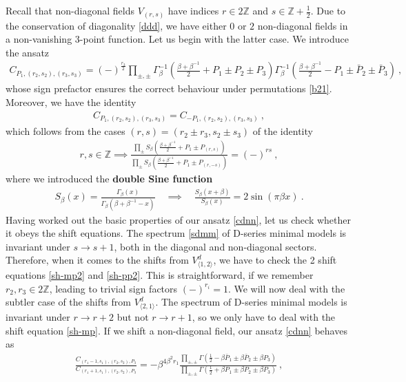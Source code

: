 \documentclass[12pt, a4paper]{article}
\newcommand{\myindex}[1]{\textbf{\boldmath #1}}
\begin{document}
Recall that non-diagonal fields $V_{(r,s)}$ have indices $r\in 2\mathbb{Z}$ and $s\in\mathbb{Z}+\frac12$. 
Due to the conservation of diagonality \eqref{ddd}, we have either $0$ or $2$ non-diagonal fields in a non-vanishing 3-point function. Let us begin with the latter case. We introduce the ansatz 
\begin{align}
 \boxed{C_{P_1,(r_2,s_2),(r_3,s_3)} = (-)^{\frac{r_3}{2}}\prod_{\pm,\pm}
 \Gamma_\beta^{-1}\left(\tfrac{\beta+\beta^{-1}}{2}+P_1 \pm P_2\pm P_3\right) 
 \Gamma_\beta^{-1}\left(\tfrac{\beta+\beta^{-1}}{2}-P_1 \pm \bar P_2\pm \bar P_3\right)}\ ,
 \label{cdnn}
\end{align}
whose sign prefactor ensures the correct behaviour under permutations \eqref{b21}. Moreover, we have the identity
\begin{align}
 C_{P_1,(r_2,s_2),(r_3,s_3)}=C_{-P_1,(r_2,s_2),(r_3,s_3)} \ ,
 \label{cpcmp}
\end{align}
which follows from the cases $(r,s)=(r_2\pm r_3,s_2\pm s_3)$ of the identity 
\begin{align}
 r,s\in\mathbb{Z} \implies \frac{\prod_\pm S_\beta\left(\frac{\beta+\beta^{-1}}{2} +P_1 \pm P_{(r,s)}\right)}{\prod_\pm S_\beta\left(\frac{\beta+\beta^{-1}}{2} +P_1 \pm P_{(r,-s)}\right)} =(-)^{rs}\ ,
 \label{dsr}
\end{align}
where we introduced the \myindex{double Sine function}
\begin{align}
 S_\beta(x) = \frac{\Gamma_\beta(x)}{\Gamma_\beta(\beta + \beta^{-1}-x)}\quad \implies \quad \frac{S_\beta(x+\beta)}{S_\beta(x)} = 2\sin(\pi\beta x)\ .
 \label{sb}
\end{align}
Having worked out the basic properties of our ansatz \eqref{cdnn}, let us check whether it obeys the shift equations. The spectrum \eqref{sdmm} of D-series minimal models is invariant under $s\to s+1$, both in the diagonal and non-diagonal sectors. Therefore, when it comes to the shifts from $V^d_{\langle 1,2\rangle}$, we have to check the 2 shift equations \eqref{sh-mp2} and \eqref{sh-pp2}. This is straightforward, if we remember $r_2,r_3\in 2\mathbb{Z}$, leading to trivial sign factors $(-)^{r_i}=1$. We will now deal with the subtler case of the shifts from $V^d_{\langle 2,1\rangle}$. The spectrum of D-series minimal models is invariant under $r\to r+2$ but not $r\to r+1$, so we only have to deal with the shift equation \eqref{sh-mp}. If we shift a non-diagonal field, our ansatz \eqref{cdnn} behaves as 
\begin{align}
 \frac{C_{(r_1-1,s_1),(r_2,s_2),P_3}}{C_{(r_1+1,s_1),(r_2,s_2),P_3}} = - \beta^{4\beta^2r_1}\frac{\prod_{\pm,\pm} \Gamma(\frac12-\beta \bar P_1\pm \beta\bar P_2\pm \beta P_3)}{\prod_{\pm,\pm} \Gamma(\frac12+\beta P_1\pm \beta P_2\pm \beta P_3)}\ , 
\end{align}
\end{document}
